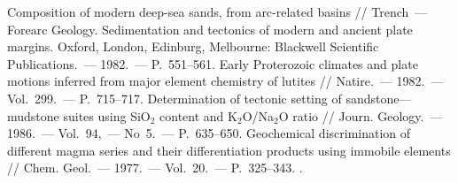 \begin{thebibliography}{99}
\bibitem{} Composition of modern deep-sea sands, from arc-related basins // Trench~--- Forearc Geology. Sedimentation and tectonics of modern and ancient plate margins. Oxford, London, Edinburg, Melbourne: Blackwell Scientific Publications.~--- 1982.~--- P.~551--561.
\bibitem{} Early Proterozoic climates and plate motions inferred from major element chemistry of lutites // Natire.~--- 1982.~--- Vol.~299.~--- P.~715--717.
\bibitem{} Determination of tectonic setting of sandstone---mudstone suites using SiO$_2$ content and K$_2$O/Na$_2$O ratio // Journ. Geology.~--- 1986.~--- Vol.~94,~--- No~5.~--- P.~635--650.
\bibitem{} Geochemical discrimination of different magma series and their differentiation products using immobile elements // Chem. Geol.~--- 1977.~--- Vol.~20.~--- P.~325--343. .

\end{thebibliography}
\thispagestyle{empty}
